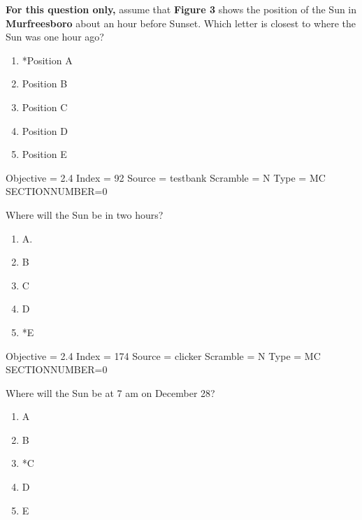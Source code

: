 \documentclass[11pt]{article}
\begin{document}
\begin{enumerate}
\begin{minipage}{\textwidth}
\begin{minipage}{\textwidth}
\item {\bf For this question only,} assume that {\bf Figure 3} shows the position of the Sun in {\bf Murfreesboro} about an hour before Sunset.   Which letter is closest to where the Sun was one hour ago?
\begin{multicols}{3}
\begin{enumerate} 
\setlength{\itemsep}{1pt} 
\setlength{\parskip}{0pt} 
\setlength{\parsep}{0pt}
\setlength{\multicolsep}{1pt} 
\item *Position A
\item Position B
\item Position C
\item Position D
\item Position E
\end{enumerate} 
\vfill 
\end{multicols}

Objective = 2.4
Index = 92
Source = testbank
Scramble = N
Type = MC
SECTIONNUMBER=0
\end{minipage}
\end{minipage}
\vskip 0.20in

\begin{minipage}{\textwidth}
\begin{minipage}{\textwidth}
\item Where will the Sun be in two hours?
\begin{multicols}{3}
\begin{enumerate} 
\setlength{\itemsep}{1pt} 
\setlength{\parskip}{0pt} 
\setlength{\parsep}{0pt}
\setlength{\multicolsep}{1pt} 
\item A.
\item B
\item C
\item D
\item *E
\end{enumerate} 
\vfill 
\end{multicols}

Objective = 2.4
Index = 174
Source = clicker
Scramble = N
Type = MC
SECTIONNUMBER=0
\end{minipage}
\end{minipage}
\vskip 0.20in

\begin{minipage}{\textwidth}
\begin{minipage}{\textwidth}
\item Where will the Sun be at 7 am on December 28?
\begin{multicols}{3}
\begin{enumerate} 
\setlength{\itemsep}{1pt} 
\setlength{\parskip}{0pt} 
\setlength{\parsep}{0pt}
\setlength{\multicolsep}{1pt} 
\item A
\item B
\item *C
\item D
\item E
\end{enumerate} 
\vfill 
\end{multicols}


\end{minipage}
\end{minipage}
\end{enumerate}
\end{document}
